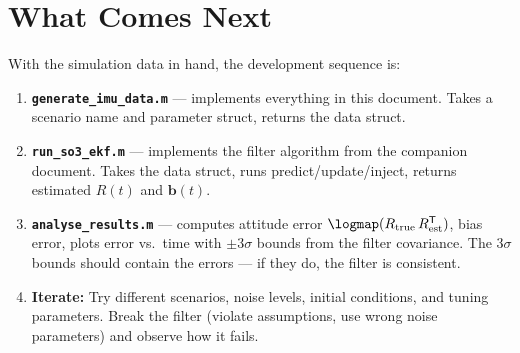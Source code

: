 \documentclass[11pt,letterpaper]{article}
\begin{document}
\section{What Comes Next}

With the simulation data in hand, the development sequence is:

\begin{enumerate}
  \item \textbf{\texttt{generate\_imu\_data.m}} --- implements
    everything in this document.  Takes a scenario name and
    parameter struct, returns the data struct.

  \item \textbf{\texttt{run\_so3\_ekf.m}} --- implements the
    filter algorithm from the companion document.  Takes the
    data struct, runs predict/update/inject, returns estimated
    $R(t)$ and $\mathbf{b}(t)$.

  \item \textbf{\texttt{analyse\_results.m}} --- computes
    attitude error $\logmap(R_{\mathrm{true}}\,
    R_{\mathrm{est}}^{\mathsf{T}})$, bias error, plots
    error vs.\ time with $\pm 3\sigma$ bounds from the filter
    covariance.  The $3\sigma$ bounds should contain the errors
    --- if they do, the filter is consistent.

  \item \textbf{Iterate:} Try different scenarios, noise levels,
    initial conditions, and tuning parameters.  Break the filter
    (violate assumptions, use wrong noise parameters) and observe
    how it fails.
\end{enumerate}
\end{document}
